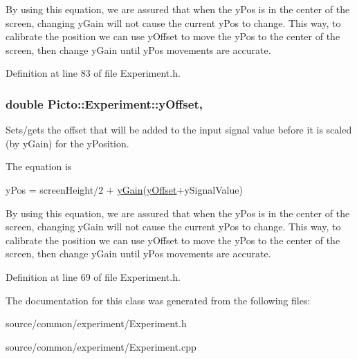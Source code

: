 By using this equation, we are assured that when the y\-Pos is in the center of the screen, changing y\-Gain will not cause the current y\-Pos to change. This way, to calibrate the position we can use y\-Offset to move the y\-Pos to the center of the screen, then change y\-Gain until y\-Pos movements are accurate. 

Definition at line 83 of file Experiment.\-h.

\hypertarget{class_picto_1_1_experiment_a26e13838e01181ba7504742f4034336f}{
\subsubsection[{y\-Offset}]{\setlength{\rightskip}{0pt plus 5cm}double Picto\-::\-Experiment\-::y\-Offset\hspace{0.3cm}{\ttfamily [read]}, {\ttfamily [write]}}}\label{class_picto_1_1_experiment_a26e13838e01181ba7504742f4034336f}


Sets/gets the offset that will be added to the input signal value before it is scaled (by y\-Gain) for the y\-Position. 

The equation is
\begin{DoxyCode}
yPos = screenHeight/2 + \hyperlink{class_picto_1_1_experiment_a9200e0644a2c450dad16aaa59864fcf9}{yGain}(\hyperlink{class_picto_1_1_experiment_a26e13838e01181ba7504742f4034336f}{yOffset}+ySignalValue) 
\end{DoxyCode}


By using this equation, we are assured that when the y\-Pos is in the center of the screen, changing y\-Gain will not cause the current y\-Pos to change. This way, to calibrate the position we can use y\-Offset to move the y\-Pos to the center of the screen, then change y\-Gain until y\-Pos movements are accurate. 

Definition at line 69 of file Experiment.\-h.



The documentation for this class was generated from the following files\-:\begin{DoxyCompactItemize}
\item 
source/common/experiment/Experiment.\-h\item 
source/common/experiment/Experiment.\-cpp\end{DoxyCompactItemize}
